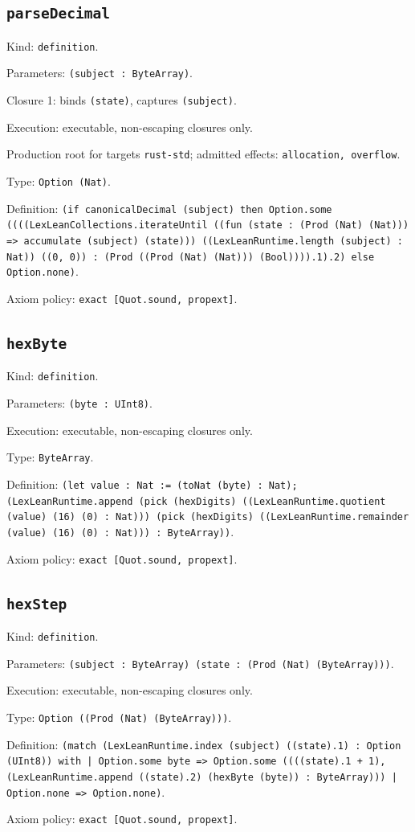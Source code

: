 \documentclass[11pt]{article}
\begin{document}
\subsection*{\texttt{parseDecimal}}
\noindent Kind: \texttt{definition}.\par
\noindent Parameters: \texttt{(subject : ByteArray)}.\par
\noindent Closure 1: binds \texttt{(state)}, captures \texttt{(subject)}.\par
\noindent Execution: executable, non-escaping closures only.\par
\noindent Production root for targets \texttt{rust-std}; admitted effects: \texttt{allocation, overflow}.\par
\noindent Type: \texttt{Option (Nat)}.\par
\noindent Definition: \texttt{(if canonicalDecimal (subject) then Option.some ((((LexLeanCollections.iterateUntil ((fun (state : (Prod (Nat) (Nat))) => accumulate (subject) (state))) ((LexLeanRuntime.length (subject) : Nat)) ((0, 0)) : (Prod ((Prod (Nat) (Nat))) (Bool)))).1).2) else Option.none)}.\par
\noindent Axiom policy: \texttt{exact [Quot.sound, propext]}.\par
\subsection*{\texttt{hexByte}}
\noindent Kind: \texttt{definition}.\par
\noindent Parameters: \texttt{(byte : UInt8)}.\par
\noindent Execution: executable, non-escaping closures only.\par
\noindent Type: \texttt{ByteArray}.\par
\noindent Definition: \texttt{(let value : Nat := (toNat (byte) : Nat); (LexLeanRuntime.append (pick (hexDigits) ((LexLeanRuntime.quotient (value) (16) (0) : Nat))) (pick (hexDigits) ((LexLeanRuntime.remainder (value) (16) (0) : Nat))) : ByteArray))}.\par
\noindent Axiom policy: \texttt{exact [Quot.sound, propext]}.\par
\subsection*{\texttt{hexStep}}
\noindent Kind: \texttt{definition}.\par
\noindent Parameters: \texttt{(subject : ByteArray) (state : (Prod (Nat) (ByteArray)))}.\par
\noindent Execution: executable, non-escaping closures only.\par
\noindent Type: \texttt{Option ((Prod (Nat) (ByteArray)))}.\par
\noindent Definition: \texttt{(match (LexLeanRuntime.index (subject) ((state).1) : Option (UInt8)) with | Option.some byte => Option.some ((((state).1 + 1), (LexLeanRuntime.append ((state).2) (hexByte (byte)) : ByteArray))) | Option.none => Option.none)}.\par
\noindent Axiom policy: \texttt{exact [Quot.sound, propext]}.\par
\end{document}
